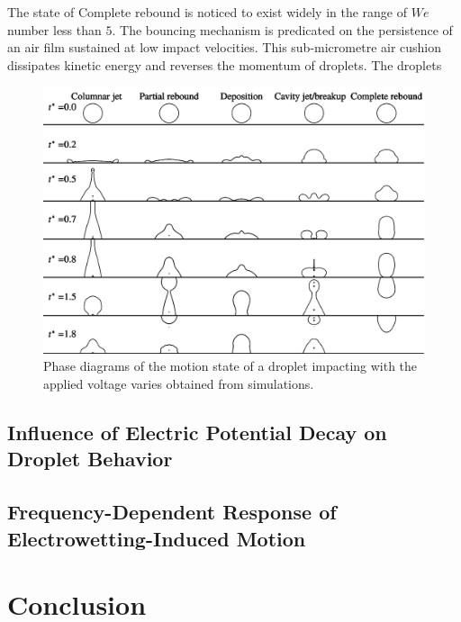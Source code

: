 \documentclass[lineno]{cls/jfm}
\begin{document}
 The state of Complete rebound is noticed to exist widely in the range of $We$ number less than $5$. The bouncing mechanism is predicated on the persistence of an air film sustained at low impact velocities. This sub-micrometre air cushion dissipates kinetic energy and reverses the momentum of droplets. The droplets 




 \begin{figure}
  \centerline{\includegraphics[width=1.0\textwidth]{fig/dropA.pdf}}
  \caption{Phase diagrams of the motion state of a droplet impacting with the applied voltage varies obtained from simulations.}
 \label{fig:mesh}
 \end{figure}

\subsection{Influence of Electric Potential Decay on Droplet Behavior}

\subsection{Frequency-Dependent Response of Electrowetting-Induced Motion}


\section{Conclusion}\label{sec:Conclusion}



\end{document}
